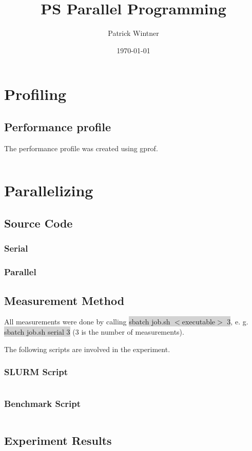 \documentclass[parskip]{scrartcl}
\title{PS Parallel Programming}
\author{Patrick Wintner}
\date{\today}
\begin{document}
	\maketitle
	
	\section{Profiling}
	\subsection{Performance profile}
	The performance profile was created using gprof.
	
	\inputminted	[linenos,breaklines]{}{src/analysis.txt}

	
	\section{Parallelizing}
	\subsection{Source Code}
	\subsubsection{Serial}
	\subsubsection{Parallel}
	\subsection{Measurement Method}
	All measurements were done by calling \colorbox{lightgray}{sbatch job.sh $<$executable$>$ 3}, e. g. \colorbox{lightgray}{sbatch job.sh serial 3} (3 is the number of measurements).
	
	The following scripts are involved in the experiment.
	\subsubsection{SLURM Script}
	\inputminted[linenos,breaklines]{bash}{src/job.sh}
	\subsubsection{Benchmark Script}
	\inputminted[linenos,breaklines]{bash}{src/benchmark.sh}
	\subsection{Experiment Results}
\end{document}

